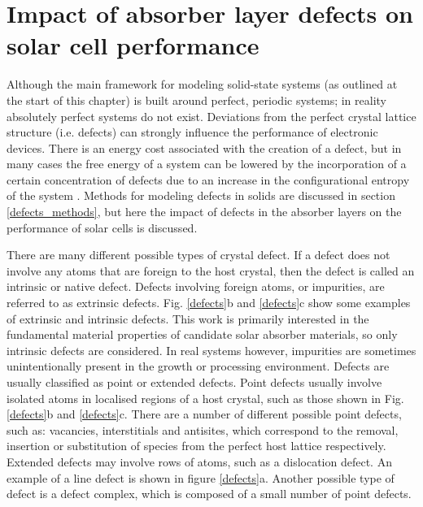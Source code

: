 \documentclass[11pt, twoside]{report}
\begin{document}
\section{Impact of absorber layer defects on solar cell performance}\label{defects_impact}
Although the main framework for modeling solid-state systems (as outlined at the start of this chapter) is built around perfect, periodic systems; in reality absolutely perfect systems do not exist. Deviations from the perfect crystal lattice structure (i.e. defects) can strongly influence the performance of electronic devices. There is an energy cost associated with the creation of a defect, but in many cases the free energy of a system can be lowered by the incorporation of a certain concentration of defects due to an increase in the configurational entropy of the system \cite{AshcroftMermin_general}. Methods for modeling defects in solids are discussed in section \ref{defects_methods}, but here the impact of defects in the absorber layers on the performance of solar cells is discussed.

There are many different possible types of crystal defect. If a defect does not involve any atoms that are foreign to the host crystal, then the defect is called an intrinsic or native defect. Defects involving foreign atoms, or impurities, are referred to as extrinsic defects. Fig. \ref{defects}b and \ref{defects}c show some examples of extrinsic and intrinsic defects. This work is primarily interested in the fundamental material properties of candidate solar absorber materials, so only intrinsic defects are considered. In real systems however, impurities are sometimes unintentionally present in the growth or processing environment.
Defects are usually classified as point or extended defects. Point defects usually involve isolated atoms in localised regions of a host crystal, such as those shown in Fig. \ref{defects}b and \ref{defects}c. There are a number of different possible point defects, such as: vacancies, interstitials and antisites, which correspond to the removal, insertion or substitution of species from the perfect host lattice respectively. Extended defects may involve rows of atoms, such as a dislocation defect. An example of a line defect is shown in figure \ref{defects}a. Another possible type of defect is a defect complex, which is composed of a small number of point defects.
\end{document}
